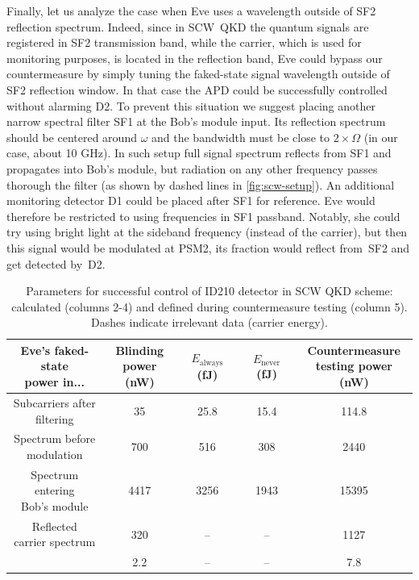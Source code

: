 Finally, let us analyze the case when Eve uses a wavelength outside of SF2 reflection spectrum. Indeed, since in SCW~QKD the quantum signals are registered in SF2 transmission band, while the carrier, which is used for monitoring purposes, is located in the reflection band, Eve could bypass our countermeasure by simply tuning the faked-state signal wavelength outside of SF2 reflection window. In that case the APD could be successfully controlled without alarming D2. To prevent this situation we suggest placing another narrow spectral filter SF1 at the Bob's module input. Its reflection spectrum should be centered around $\omega$ and the bandwidth must be close to $2\times\Omega$ (in our case, about 10 GHz). In such setup full signal spectrum reflects from SF1 and propagates into Bob's module, but radiation on any other frequency passes thorough the filter (as shown by dashed lines in \ref{fig:scw-setup}). An additional monitoring detector D1 could be placed after SF1 for reference. Eve would therefore be restricted to using frequencies in SF1 passband. Notably, she could try using bright light at the sideband frequency (instead of the carrier), but then this signal would be modulated at PSM2, its fraction would reflect from~SF2 and get detected by~D2.

\begin{table}
	\centering \caption{\label{tab:blinding2}Parameters for successful control of ID210 detector in SCW QKD scheme: calculated (columns 2-4) and defined during countermeasure testing (column 5). Dashes indicate irrelevant data (carrier energy).}
	\begin{tabular}[t]{c c c c c}
	\hline\hline
	\makecell{Eve's faked-state\\ power in...} & \makecell{Blinding\\ power (nW)} & $E_\text{always}$ (fJ) & $E_\text{never}$ (fJ) & \makecell {Countermeasure\\testing power (nW)} \\
	\hline
	\makecell{Subcarriers after\\ filtering} & 35 & 25.8 & 15.4 & 114.8\\
	\makecell{Spectrum before\\ modulation} & 700 & 516 & 308 & 2440\\
	\makecell{Spectrum entering\\ Bob's module} & 4417 & 3256 & 1943 & 15395\\
	\makecell{Reflected\\carrier spectrum} & 320 & -- & -- & 1127\\
	\makecell{D2 input} & 2.2 & -- & -- & 7.8\\
	\hline\hline
	\end{tabular}
\end{table}

